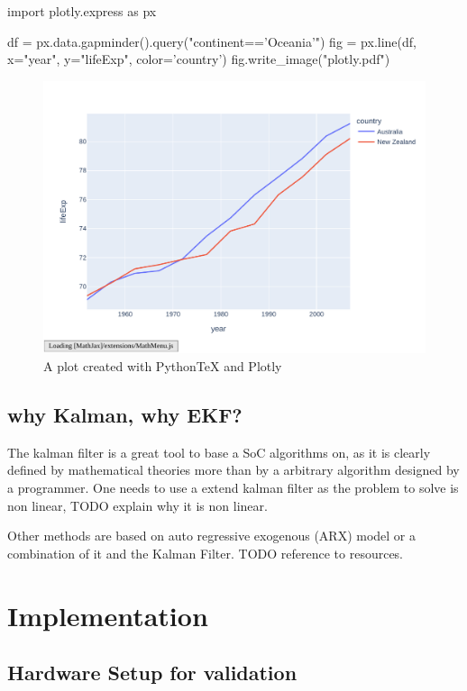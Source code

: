 \begin{pylabcode}
import plotly.express as px

df = px.data.gapminder().query("continent=='Oceania'")
fig = px.line(df, x="year", y="lifeExp", color='country')
fig.write_image("plotly.pdf")
\end{pylabcode}
	
\begin{figure}[h!]
\includegraphics{plotly}
\caption{\label{fig:plotly} A plot created with PythonTeX and Plotly}
\end{figure}

\section{why Kalman, why EKF?}

The kalman filter is a great tool to base a SoC algorithms on, as it is clearly defined by mathematical theories more than by a arbitrary algorithm designed by a programmer. One needs to use a extend kalman filter as the problem to solve is non linear, TODO explain why it is non linear. 

Other methods are based on auto regressive exogenous (ARX) model or a combination of it and the Kalman Filter. TODO reference to resources.

\chapter{Implementation}

\section{Hardware Setup for validation}

